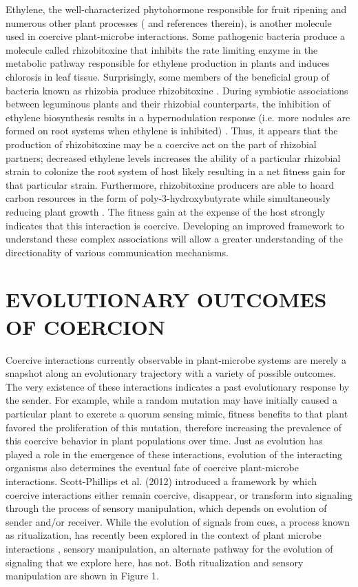 Ethylene, the well-characterized phytohormone responsible for fruit ripening and numerous other plant processes (\parencite{bleecker2000} and references therein), is another molecule used in coercive plant-microbe interactions. Some pathogenic bacteria produce a molecule called rhizobitoxine that inhibits the rate limiting enzyme in the metabolic pathway responsible for ethylene production in plants \parencite{yasuta1999} and induces chlorosis in leaf tissue. Surprisingly, some members of the beneficial group of bacteria known as rhizobia produce rhizobitoxine \parencite{yuhashi2000}. During symbiotic associations between leguminous plants and their rhizobial counterparts, the inhibition of ethylene biosynthesis results in a hypernodulation response (i.e. more nodules are formed on root systems when ethylene is inhibited) \parencite{penmetsa1997}. Thus, it appears that the production of rhizobitoxine may be a coercive act on the part of rhizobial partners; decreased ethylene levels increases the ability of a particular rhizobial strain to colonize the root system of host likely resulting in a net fitness gain for that particular strain. Furthermore, rhizobitoxine producers are able to hoard carbon resources in the form of poly-3-hydroxybutyrate while simultaneously reducing plant growth \textcite{ratcliff2009}. The fitness gain at the expense of the host strongly indicates that this interaction is coercive. Developing an improved framework to understand these complex associations will allow a greater understanding of the directionality of various communication mechanisms. 

\section{EVOLUTIONARY OUTCOMES OF COERCION}
Coercive interactions currently observable in plant-microbe systems are merely a snapshot along an evolutionary trajectory with a variety of possible outcomes. The very existence of these interactions indicates a past evolutionary response by the sender. For example, while a random mutation may have initially caused a particular plant to excrete a quorum sensing mimic, fitness benefits to that plant favored the proliferation of this mutation, therefore increasing the prevalence of this coercive behavior in plant populations over time. 
Just as evolution has played a role in the emergence of these interactions, evolution of the interacting organisms also determines the eventual fate of coercive plant-microbe interactions. Scott-Phillips et al. (2012) introduced a framework by which coercive interactions either remain coercive, disappear, or transform into signaling through the process of sensory manipulation, which depends on evolution of sender and/or receiver. While the evolution of signals from cues, a process known as ritualization, has recently been explored in the context of plant microbe interactions \parencite{padje2016}, sensory manipulation, an alternate pathway for the evolution of signaling that we explore here, has not. Both ritualization and sensory manipulation are shown in Figure 1. 

